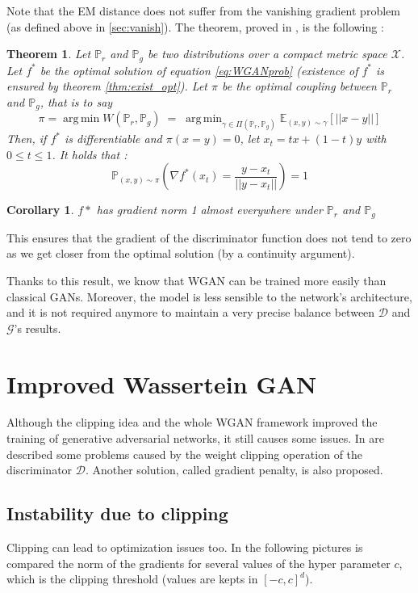 \documentclass[a4paper]{report}
\newcommand{\G}{\mathcal{G}}
\newcommand{\D}{\mathcal{D}}
\newcommand{\X}{\mathcal{X}}
\newcommand{\Expec}{\mathbb{E}}
\newcommand{\Prob}{\mathbb{P}}
\DeclareMathOperator*{\argmin}{arg\,min}
\theoremstyle{plain}
\newtheorem{thm}{Theorem}
\newtheorem{corol}{Corollary}
\theoremstyle{remark}
\theoremstyle{definition}
\begin{document}
Note that the EM distance does not suffer from the vanishing gradient problem (as defined above in \ref{sec:vanish}). The theorem, proved in \cite{gulrajani2017improved}, is the following :

\begin{thm}
\label{thm:norm1}
Let $\Prob_r$ and $\Prob_g$ be two distributions over a compact metric space $\X$. Let $f^*$ be the optimal solution of equation \ref{eq:WGANprob} (existence of $f^*$ is ensured by theorem \ref{thm:exist_opt}). Let $\pi$ be the optimal coupling between $\Prob_r$ and $\Prob_g$, that is to say $$\pi = \argmin W(\Prob_r, \Prob_g) \;=\; \argmin_{\gamma \in \Pi(\Prob_r,\Prob_g)} \Expec_{(x,y) \sim \gamma}[ ||x-y|| ]$$ Then, if $f^*$ is differentiable and $\pi (x = y) = 0$, 
let $x_t = tx + (1-t)y$ with $0 \leqslant t \leqslant 1$. It holds that :
$$ \Prob_{(x,y) \sim \pi} \left( \nabla f^*(x_t) = \frac{y - x_t}{||y - x_t ||} \right) = 1 $$
\end{thm}
\begin{corol}
$f*$ has gradient norm 1 almost everywhere under $\Prob_r$ and $\Prob_g$
\end{corol}

This ensures that the gradient of the discriminator function does not tend to zero as we get closer from the optimal solution (by a continuity argument).

Thanks to this result, we know that WGAN can be trained more easily than classical GANs. Moreover, the model is less sensible to the network's architecture, and it is not required anymore to maintain a very precise balance between $\D$ and $\G$'s results.

\chapter{Improved Wassertein GAN}

Although the clipping idea and the whole WGAN framework improved the training of generative adversarial networks, it still causes some issues. In \cite{gulrajani2017improved} are described some problems caused by the weight clipping operation of the discriminator $\D$. Another solution, called gradient penalty, is also proposed.

\section{Instability due to clipping}

Clipping can lead to optimization issues too. In the following pictures is compared the norm of the gradients for several values of the hyper parameter $c$, which is the clipping threshold (values are kepts in $[-c,c]^d$).
\end{document}
